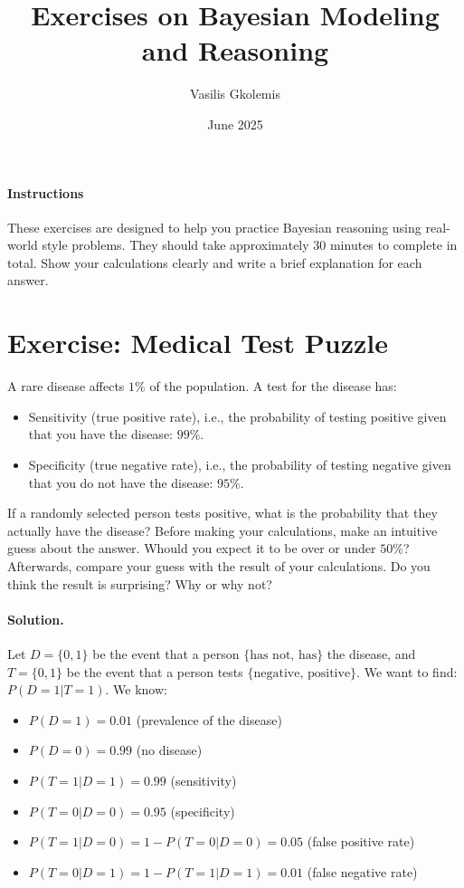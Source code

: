 \documentclass[11pt]{article}
\title{Exercises on Bayesian Modeling and Reasoning}
\author{Vasilis Gkolemis}
\date{June 2025}
\newif\ifshowanswers
\begin{document}
\maketitle

\paragraph{Instructions}
These exercises are designed to help you practice Bayesian reasoning using real-world style problems. They should take approximately 30 minutes to complete in total. Show your calculations clearly and write a brief explanation for each answer.

\section{Exercise: Medical Test Puzzle}
A rare disease affects $1\%$ of the population. A test for the disease has:
\begin{itemize}
  \item Sensitivity (true positive rate), i.e., the probability of testing positive given that you have the disease: $99\%$.
  \item Specificity (true negative rate), i.e., the probability of testing negative given that you do not have the disease: $95\%$.
\end{itemize}
If a randomly selected person tests positive, what is the probability that they actually have the disease?
Before making your calculations, make an intuitive guess about the answer. Whould you expect it to be over or under $50\%$?
Afterwards, compare your guess with the result of your calculations.
Do you think the result is surprising? Why or why not?

\ifshowanswers
\paragraph{Solution.}

Let $D = \{0, 1\}$ be the event that a person $\{\text{has not, has}\}$ the disease,
and
$T = \{0, 1\}$ be the event that a person tests $\{\text{negative, positive}\}$.
We want to find: $P(D = 1 | T = 1)$.
We know:

\begin{itemize}
  \item $P(D = 1) = 0.01$ (prevalence of the disease)
  \item $P(D = 0) = 0.99$ (no disease)
  \item $P(T = 1 | D = 1) = 0.99$ (sensitivity)
  \item $P(T = 0 | D = 0) = 0.95$ (specificity)
  \item $P(T = 1 | D = 0) = 1 - P(T = 0 | D = 0) = 0.05$ (false positive rate)
  \item $P(T = 0 | D = 1) = 1 - P(T = 1 | D = 1) = 0.01$ (false negative rate)
\end{itemize}
\end{document}
